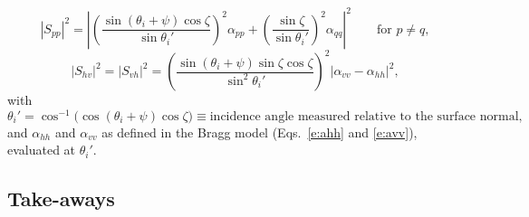 \documentclass[11pt, oneside]{article}
\begin{document}
\begin{itemize}
	\begin{equation}
		\label{e:Gpp}
		|S_{pp}|^2 = \left|\left(\frac{\sin(\theta_i + \psi)\cos\zeta}{\sin\theta_i'}\right)^2\alpha_{pp} + \left(\frac{\sin\zeta}{\sin\theta_i'}\right)^2\alpha_{qq}\right|^2 \qquad \text{for } p \ne q,
	\end{equation}
	\begin{equation}
		\label{e:Ghv}
		|S_{hv}|^2 = |S_{vh}|^2 = \left(\frac{\sin(\theta_i + \psi)\sin\zeta\cos\zeta}{\sin^2\theta_i'}\right)^2\left|\alpha_{vv} - \alpha_{hh}\right|^2,
	\end{equation}
	with
	\begin{equation}
		\label{e:thm}
		\theta_i' = \cos^{-1}\big(\cos(\theta_i + \psi)\cos\zeta\big) \equiv \text{incidence angle measured relative to the surface normal},
	\end{equation}
	and $\alpha_{hh}$ and $\alpha_{vv}$ as defined in the Bragg model (Eqs.~\ref{e:ahh} and \ref{e:avv}), evaluated at $\theta_i'$.
\end{itemize}

\subsection{Take-aways}
\end{document}
